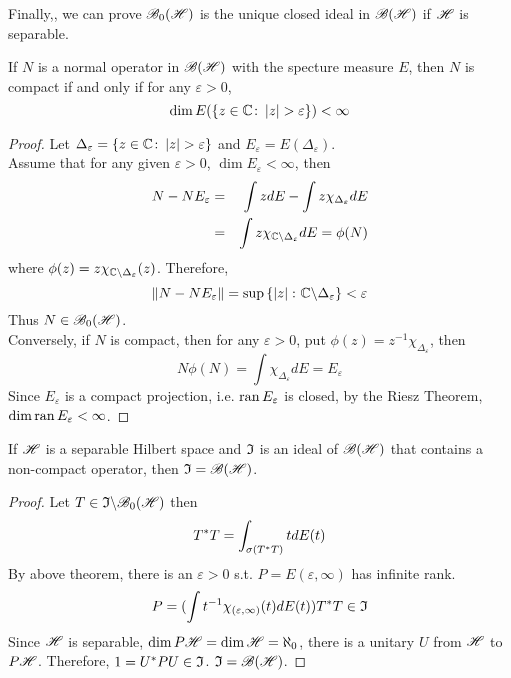 \documentclass[a4paper,11pt]{report}
\begin{document}
Finally,, we can prove $\mathscr{B}_{0}\mathscr{(H)}$ is the unique closed ideal in $\mathscr{B(H)}$ if $\mathscr{H}$ is separable. 
\begin{prop}
	If $N$ is a normal operator in $\mathscr{B(H)}$ with the specture measure $E$, then $N$ is compact if and only if for any $\varepsilon > 0$,
	\begin{equation*}
		\dim{E(\{z \in \mathbb{C}\colon \left\lvert z\right\lvert > \varepsilon\})} < \infty
	\end{equation*}
\end{prop}
\begin{proof}
	Let $\Delta_{\varepsilon} = \{z \in \mathbb{C} \colon \left\lvert z\right\lvert > \varepsilon\}$ and $E_{\varepsilon} = E(\Delta_{\varepsilon})$.\\
	Assume that for any given $\varepsilon > 0$, $\dim{E_{\varepsilon}} < \infty$, then
	\begin{eqnarray*}
		N - NE_{\varepsilon} &=& \int z dE - \int z\chi_{\Delta_{\varepsilon}} dE \\
		&=& \int z\chi_{\mathbb{C} \backslash \Delta_{\varepsilon}} dE = \phi(N)
	\end{eqnarray*}
	where $\phi(z) = z\chi_{\mathbb{C} \backslash \Delta_{\varepsilon}}(z)$. Therefore,
	\begin{equation*}
		\left\lVert N - NE_{\varepsilon}\right\lVert = \sup{\{\left\lvert z\right\lvert \colon \mathbb{C}\backslash \Delta_{\varepsilon}\}} < \varepsilon
	\end{equation*}
	Thus $N \in \mathscr{B}_{0}\mathscr{(H)}$. \\
	Conversely, if $N$ is compact, then for any $\varepsilon > 0$, put $\phi(z) = z^{-1}\chi_{\Delta_{\varepsilon}}$, then
	\begin{equation*}
		N\phi(N) = \int \chi_{\Delta_{\varepsilon}} dE = E_{\varepsilon} 
	\end{equation*}
	Since $E_{\varepsilon}$ is a compact projection, i.e. $\operatorname{ran}{E_{\varepsilon}}$ is closed, by the Riesz Theorem, $\dim{\operatorname{ran}{E_{\varepsilon}}} < \infty$.
\end{proof}

\begin{thm}
	If $\mathscr{H}$ is a separable Hilbert space and $\mathfrak{I}$ is an ideal of $\mathscr{B(H)}$ that contains a non-compact operator, then $\mathfrak{I} = \mathscr{B(H)}$.
\end{thm}
\begin{proof}
	Let $T \in \mathfrak{I} \backslash \mathscr{B}_{0}\mathscr{(H)}$ then 
	\begin{equation*}
		T^{*}T = \int_{\sigma(T^{*}T)} t dE(t)
	\end{equation*}
	By above theorem, there is an $\varepsilon > 0$ s.t. $P = E(\varepsilon,\infty)$ has infinite rank. 
	\begin{equation*}
		P = (\int t^{-1}\chi_{(\varepsilon,\infty)}(t)dE(t))T^{*}T \in \mathfrak{I}
	\end{equation*}
	Since $\mathscr{H}$ is separable, $\dim{P\mathscr{H}} = \dim{\mathscr{H}} = \aleph_0$, there is a unitary $U$ from $\mathscr{H}$ to $P\mathscr{H}$. Therefore, $1 = U^{*}PU \in \mathfrak{I}$. $\mathfrak{I} = \mathscr{B(H)}$.
\end{proof}
\end{document}
